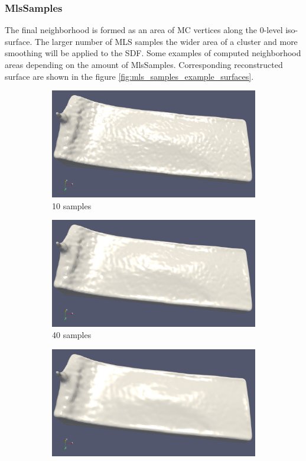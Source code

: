 \subsubsection{MlsSamples}
The final neighborhood is formed as an area of MC vertices along the 0-level iso-surface. The larger number of MLS samples the wider area of a cluster and more smoothing will be applied to the SDF. Some examples of computed neighborhood areas depending on the amount of MlsSamples. Corresponding reconstructed surface are shown in the figure \ref{fig:mls_samples_example_surfaces}.
\begin{figure}[H]
	\begin{center}
		\begin{subfigure}[b]{0.4\textwidth}
			\includegraphics[width=\textwidth]{figures/MlsSamples10.png}
			\caption{10 samples}
		\end{subfigure}
		\begin{subfigure}[b]{0.4\textwidth}
			\includegraphics[width=\textwidth]{figures/MlsSamples40.png}
			\caption{40 samples}
		\end{subfigure}
		\begin{subfigure}[b]{0.4\textwidth}
			\includegraphics[width=\textwidth]{figures/MlsSamples80png.png}

\end{subfigure}
\end{center}
\end{figure}
